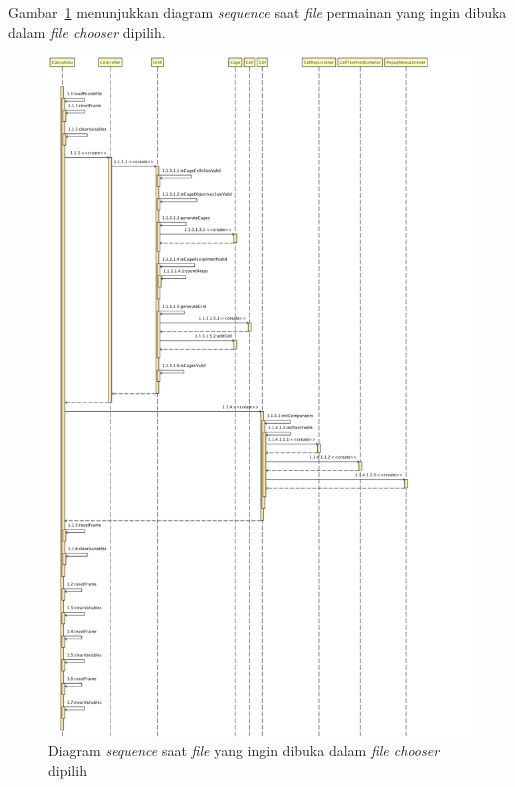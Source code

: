 Gambar~\ref{fig:sequencefilechooser} menunjukkan diagram \textit{sequence} saat \textit{file} permainan yang ingin dibuka dalam \textit{file chooser} dipilih.

\begin{figure}
\centering
\captionsetup{justification=centering}
\includegraphics[scale=0.3]{Gambar/Analisis/SequenceDiagramFileChooser.png}
\caption[Diagram \textit{sequence} saat \textit{file} yang ingin dibuka dalam \textit{file chooser} dipilih]{Diagram \textit{sequence} saat \textit{file} yang ingin dibuka dalam \textit{file chooser} dipilih}
\label{fig:sequencefilechooser}
\end{figure}

